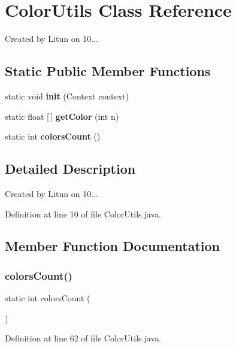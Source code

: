 \section{Color\+Utils Class Reference}
\label{classru_1_1litun_1_1unitingtwist_1_1_color_utils}


Created by Litun on 10...  


\subsection*{Static Public Member Functions}
\begin{DoxyCompactItemize}
\item 
static void \textbf{ init} (Context context)
\item 
static float [$\,$] \textbf{ get\+Color} (int n)
\item 
static int \textbf{ colors\+Count} ()
\end{DoxyCompactItemize}


\subsection{Detailed Description}
Created by Litun on 10... 

Definition at line 10 of file Color\+Utils.\+java.



\subsection{Member Function Documentation}
\mbox{\label{classru_1_1litun_1_1unitingtwist_1_1_color_utils_ac3c1b83de2ac679481c2a1f30e47779e}} 
\subsubsection{colors\+Count()}
{\footnotesize\ttfamily static int colors\+Count (\begin{DoxyParamCaption}{ }\end{DoxyParamCaption})\hspace{0.3cm}{\ttfamily [static]}}



Definition at line 62 of file Color\+Utils.\+java.

